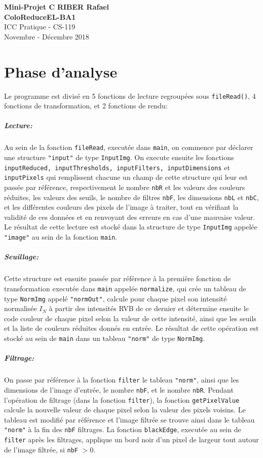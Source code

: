 \documentclass[a4paper, 11pt]{article}
\begin{document}
\noindent
\large\textbf{Mini-Projet C\raisebox{.5\height}{\scalebox{.5}{++}}} \hfill \textbf{RIBER Rafael} \\
\large\textbf{ColoReduce}\hfill \textbf{EL-BA1}\\
\normalsize ICC Pratique - CS-119\\
\hfill Novembre - Décembre 2018

\section*{Phase d'analyse}
Le programme est divisé en 5 fonctions de lecture regroupées sous \texttt{fileRead()}, 4 fonctions de transformation, et 2 fonctions de rendu:
\subparagraph{\textit{Lecture:}}
Au sein de la fonction \texttt{fileRead}, executée dans \texttt{main}, on commence par déclarer une structure \texttt{"input"} de type \texttt{InputImg}. On execute ensuite les fonctions \texttt{inputReduced, inputThresholds, inputFilters, inputDimensions} et \texttt{inputPixels} qui remplissent chacune un champ de cette structure qui leur est passée par référence, respectivement le nombre \texttt{nbR} et les valeurs des couleurs réduites, les valeurs des seuils, le nombre de filtres \texttt{nbF}, les dimensions \texttt{nbL} et \texttt{nbC}, et les différentes couleurs des pixels de l'image à traiter, tout en vérifiant la validité de ces données et en renvoyant des erreurs en cas d'une mauvaise valeur. Le résultat de cette lecture est stocké dans la structure de type \texttt{InputImg} appelée \texttt{"image"} au sein de la fonction \texttt{main}.

\subparagraph{\textit{Seuillage:}}
Cette structure est ensuite passée par référence à la première fonction de transformation executée dans \texttt{main} appelée \texttt{normalize}, qui crée un tableau de type \texttt{NormImg} appelé \texttt{"normOut"}, calcule pour chaque pixel son intensité normalisée $I_N$ à partir des intensités RVB de ce dernier et détermine ensuite le code couleur de chaque pixel selon la valeur de cette intensité, ainsi que les seuils et la liste de couleurs réduites donnés en entrée. Le résultat de cette opération est stocké au sein de \texttt{main} dans un tableau \texttt{"norm"} de type \texttt{NormImg}.

\subparagraph{\textit{Filtrage:}} On passe par référence à la fonction \texttt{filter} le tableau \texttt{"norm"}, ainsi que les dimensions de l'image d'entrée, le nombre \texttt{nbF}, et le nombre \texttt{nbR}. Pendant l'opération de filtrage (dans la fonction \texttt{filter}), la fonction \texttt{getPixelValue} calcule la nouvelle valeur de chaque pixel selon la valeur des pixels voisins. Le tableau est modifié par référence et l'image filtrée se trouve ainsi dans le tableau \texttt{"norm"} à la fin des \texttt{nbF} filtrages. La fonction \texttt{blackEdge}, executée au sein de \texttt{filter} après les filtrages, applique un bord noir d'un pixel de largeur tout autour de l'image filtrée, si \texttt{nbF} $> 0$.
\end{document}
